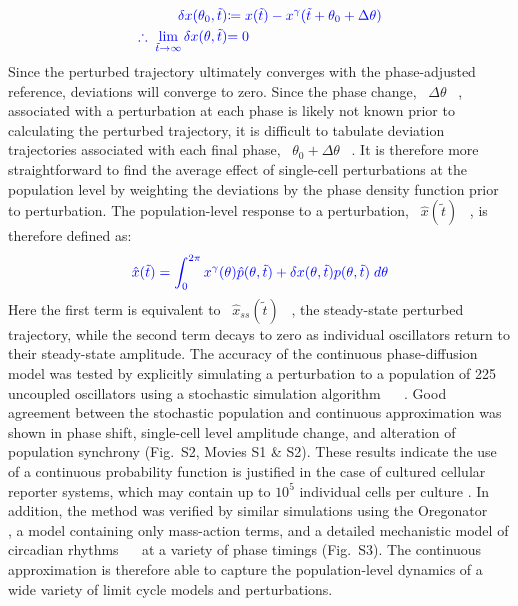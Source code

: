 \documentclass[11pt, letterpaper]{article}
\providecommand{\DIFadd}[1]{{\protect\color{blue}#1}} %
\providecommand{\DIFdel}[1]{{\protect\color{red}}}                      %
\providecommand{\DIFaddbegin}{} %
\providecommand{\DIFaddend}{} %
\providecommand{\DIFdelbegin}{} %
\providecommand{\DIFdelend}{} %
\begin{document}
\DIFdelend \DIFaddbegin \begin{align}\DIFadd{
  \delta x(\theta_0, \tilde{t}) }&\DIFadd{\coloneqq x(\tilde{t}) - x^\gamma(\tilde{t} + \theta_0 + \Delta \theta) }\\
  \DIFadd{\therefore\; \lim_{\tilde{t} \to \infty} \delta x(\theta, \tilde{t}) }&\DIFadd{= 0
}\end{align}
\DIFadd{Since the perturbed trajectory ultimately converges with the phase-adjusted reference, deviations will converge to zero.
Since the phase change, \mbox{%
$\Delta\theta$
}%
, associated with a perturbation at each phase is likely not known prior to calculating the perturbed trajectory, it is difficult to tabulate deviation trajectories associated with each final phase, \mbox{%
$\theta_0 + \Delta\theta$
}%
.
It is therefore more straightforward to find the average effect of single-cell perturbations at the population level by weighting the deviations by the phase density function prior to perturbation.
The population-level response to a perturbation, \mbox{%
$\hat{x}(\tilde{t})$
}%
, is therefore defined as:
}\begin{equation}\DIFadd{
  \hat{x}(\tilde{t}) = \int_0^{2\pi} x^\gamma(\theta)\hat{p}(\theta, \tilde{t}) + \delta x(\theta, \tilde{t})p(\theta, \tilde{t}) \; d\theta
  \label{eq:xhat}
}\end{equation}
\DIFadd{Here the first term is equivalent to \mbox{%
$\hat{x}_{ss}(\tilde{t})$
}%
, the steady-state perturbed trajectory, while the second term decays to zero as individual oscillators return to their steady-state amplitude.
}\DIFaddend The accuracy of the continuous phase-diffusion model was tested by explicitly simulating a \DIFaddbegin \DIFadd{perturbation to a }\DIFaddend population of 225 uncoupled oscillators using a stochastic simulation algorithm \DIFdelbegin \DIFdel{\mbox{%
\cite{Sanft2011a}
}%
}\DIFdelend \DIFaddbegin \DIFadd{\mbox{%
\cite{Gillespie1977, Sanft2011a}
}%
}\DIFaddend .
Good agreement between the stochastic population and continuous approximation was shown in phase shift, single-cell level amplitude change, and alteration of population synchrony (Fig.\DIFaddbegin \DIFadd{~}\DIFaddend S2, Movies S1 \& S2).
These results indicate the use of a continuous probability function is justified in the case of \DIFdelbegin \DIFdel{biological }\DIFdelend \DIFaddbegin \DIFadd{cultured cellular reporter }\DIFaddend systems, which may contain up to $10^5$ individual cells per culture \cite{Welsh2004}.
\DIFaddbegin \DIFadd{In addition, the method was verified by similar simulations using the Oregonator \mbox{%
\cite{Field1974}
}%
, a model containing only mass-action terms, and a detailed mechanistic model of circadian rhythms \mbox{%
\cite{Hirota2012}
}%
at a variety of phase timings (Fig.~S3).
The continuous approximation is therefore able to capture the population-level dynamics of a wide variety of limit cycle models and perturbations.
}
\end{document}
